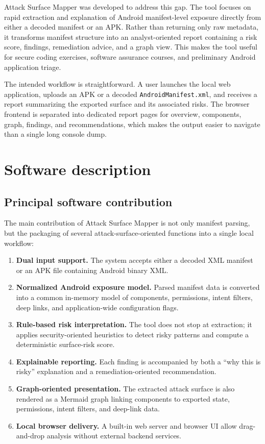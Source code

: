 \documentclass[preprint,12pt,a4paper]{elsarticle}
\begin{document}
Attack Surface Mapper was developed to address this gap. The tool focuses on rapid extraction and explanation of Android manifest-level exposure directly from either a decoded manifest or an APK. Rather than returning only raw metadata, it transforms manifest structure into an analyst-oriented report containing a risk score, findings, remediation advice, and a graph view. This makes the tool useful for secure coding exercises, software assurance courses, and preliminary Android application triage.

The intended workflow is straightforward. A user launches the local web application, uploads an APK or a decoded \texttt{AndroidManifest.xml}, and receives a report summarizing the exported surface and its associated risks. The browser frontend is separated into dedicated report pages for overview, components, graph, findings, and recommendations, which makes the output easier to navigate than a single long console dump.

\section{Software description}

\subsection{Principal software contribution}

The main contribution of Attack Surface Mapper is not only manifest parsing, but the packaging of several attack-surface-oriented functions into a single local workflow:

\begin{enumerate}[leftmargin=*,label=\textbf{C\arabic*.}]
\item \textbf{Dual input support.} The system accepts either a decoded XML manifest or an APK file containing Android binary XML.
\item \textbf{Normalized Android exposure model.} Parsed manifest data is converted into a common in-memory model of components, permissions, intent filters, deep links, and application-wide configuration flags.
\item \textbf{Rule-based risk interpretation.} The tool does not stop at extraction; it applies security-oriented heuristics to detect risky patterns and compute a deterministic surface-risk score.
\item \textbf{Explainable reporting.} Each finding is accompanied by both a ``why this is risky'' explanation and a remediation-oriented recommendation.
\item \textbf{Graph-oriented presentation.} The extracted attack surface is also rendered as a Mermaid graph linking components to exported state, permissions, intent filters, and deep-link data.
\item \textbf{Local browser delivery.} A built-in web server and browser UI allow drag-and-drop analysis without external backend services.
\end{enumerate}
\end{document}
